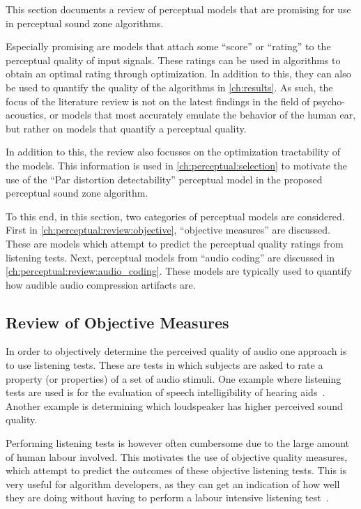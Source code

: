 This section documents a review of perceptual models that are promising for use in perceptual sound zone
algorithms.

Especially promising are models that attach some ``score'' or ``rating'' to the perceptual quality of input signals.
These ratings can be used in algorithms to obtain an optimal rating through optimization.
In addition to this, they can also be used to quantify the quality of the algorithms in \autoref{ch:results}.
As such, the focus of the literature review is not on the latest findings in the field of psycho-acoustics, or models 
that most accurately emulate the behavior of the human ear, but rather on models that quantify a perceptual quality.

In addition to this, the review also focusses on the optimization tractability of the models.
This information is used in \autoref{ch:perceptual:selection} to motivate the use of the 
``Par distortion detectability'' perceptual model in the proposed perceptual sound zone algorithm.

To this end, in this section, two categories of perceptual models are considered.
First in \autoref{ch:perceptual:review:objective}, ``objective measures'' are discussed.
These are models which attempt to predict the perceptual quality ratings from listening tests. 
Next, perceptual models from ``audio coding'' are discussed in \autoref{ch:perceptual:review:audio_coding}.
These models are typically used to quantify how audible audio compression artifacts are.


\subsection{Review of Objective Measures}
\label{ch:perceptual:review:objective}
In order to objectively determine the perceived quality of audio one approach is to use listening tests.
These are tests in which subjects are asked to rate a property (or properties) of a set of audio stimuli.
One example where listening tests are used is for the evaluation of speech 
intelligibility of hearing aids~\cite{taal2011algorithm}.
Another example is determining which loudspeaker has higher perceived sound quality.

Performing listening tests is however often cumbersome due to the large amount of human labour involved.
This motivates the use of objective quality measures, which attempt to predict the outcomes of these objective listening tests.
This is very useful for algorithm developers, as they can get an indication of how well they are doing
without having to perform a labour intensive listening test~\cite{taal2011algorithm}.

